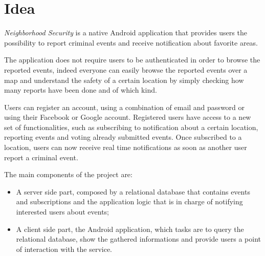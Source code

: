 \documentclass[a4paper]{scrreprt}
\begin{document}
\section{Idea}
\emph{Neighborhood Security} is a native Android application that provides  users the possibility to report criminal events and receive notification about favorite areas.

\bigskip The application does not require users to be authenticated in order to browse the reported events, indeed everyone can easily  browse the reported events over a map and understand the safety of a certain location by simply checking how many reports have been done and of which kind.

Users can register an account, using a combination of email and password or using their Facebook or Google account. Registered users have access to a new set of functionalities, such as  subscribing to notification about a certain location, reporting events and voting already submitted events. Once subscribed to a location, users can now receive real time notifications as soon as another user report a criminal event.

\bigskip The main components of the project are:
\begin{itemize}
\item A server side part, composed by a relational database that contains events and subscriptions and the application logic that is in charge of notifying interested users about events;
\item A client side part, the Android application,  which tasks are to query the relational database, show the gathered informations and provide users a point of interaction with the service.
\end{itemize}
\end{document}
